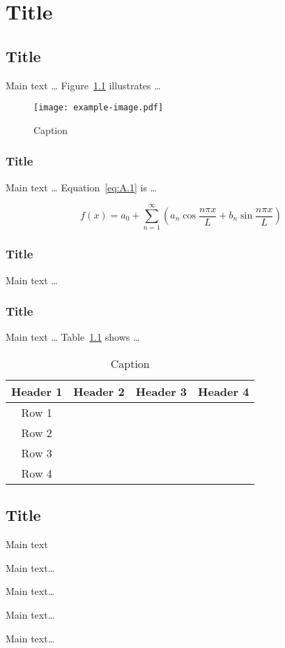 \documentclass[degree=doctor,language=english]{thuthesis}
\begin{document}
\appendix

\chapter{Title}

\section{Title}

Main text … Figure~\ref{fig:A.1} illustrates …

\begin{figure}
  \centering
  \texttt{[image: example-image.pdf]}
  \caption{Caption}
  \label{fig:A.1}
\end{figure}

\subsection{Title}

Main text … Equation~\eqref{eq:A.1} is …

\begin{equation}
  f(x) = a_0 + \sum_{n=1}^\infty \left( a_n \cos⁡ \frac{n \pi x}{L}
    + b_n \sin⁡ \frac{n \pi x}{L} \right)
  \label{eq:A.1}
\end{equation}

\subsection{Title}

Main text …

\subsection{Title}

Main text … Table~\ref{tab:A.1} shows …

\begin{table}
  \centering
  \caption{Caption}
  \label{tab:A.1}
  \begin{tabular}{cccc}
    \toprule
    Header 1 & Header 2 & Header 3 & Header 4 \\
    \midrule
    Row 1 &  &  & \\
    Row 2 &  &  & \\
    Row 3 &  &  & \\
    Row 4 &  &  & \\
    \bottomrule
  \end{tabular}
\end{table}


\section{Title}

Main text


\begin{acknowledgements}
  Main text\dots
\end{acknowledgements}

\statement

\begin{resume}
  Main text\dots
\end{resume}

\begin{comments}
  Main text\dots
\end{comments}

\begin{resolution}
  Main text\dots
\end{resolution}

\clearpage
\OMIT
\end{document}
